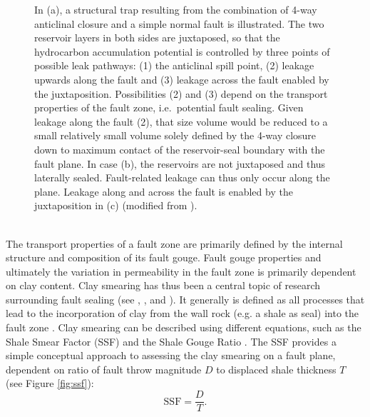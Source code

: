 \begin{figure}[h]
\begin{subfigure}{0.18\textwidth}
			\end{subfigure}
			\caption{In (a), a structural trap resulting from the combination of 4-way anticlinal closure and a simple normal fault is illustrated. The two reservoir layers in both sides are juxtaposed, so that the hydrocarbon accumulation potential is controlled by three points of possible leak pathways: (1) the anticlinal spill point, (2) leakage upwards along the fault and (3) leakage across the fault enabled by the juxtaposition. Possibilities (2) and (3) depend on the transport properties of the fault zone, i.e.\ potential fault sealing. Given leakage along the fault (2), that size volume would be reduced to a small relatively small volume solely defined by the 4-way closure down to maximum contact of the reservoir-seal boundary with the fault plane. In case (b), the reservoirs are not juxtaposed and thus laterally sealed. Fault-related leakage can thus only occur along the plane. Leakage along and across the fault is enabled by the juxtaposition in (c) (modified from \citet{van2003lateral}).}\label{fig:fault_trap_spills}
		\end{figure}\\
		The transport properties of a fault zone are primarily defined by the internal structure and composition of its fault gouge. Fault gouge properties and ultimately the variation in permeability in the fault zone is primarily dependent on clay content. Clay smearing has thus been a central topic of research surrounding fault sealing (see \citet{lindsay1993outcrop} \citet{yielding1997quantitative}, \citet{van2003lateral} , \citet{van2005processes} and \citet{schmatz2010clay}). It generally is defined as all processes that lead to the incorporation of clay from the wall rock (e.g. a shale as seal) into the fault zone \citep{van2003lateral, vrolijk2016clay}. Clay smearing can be described using different equations, such as the Shale Smear Factor (SSF) and the Shale Gouge Ratio \citep{lindsay1993outcrop, yielding1997quantitative, vrolijk2016clay}. The SSF provides a simple conceptual approach to assessing the clay smearing on a fault plane, dependent on ratio of fault throw magnitude $D$ to displaced shale thickness $T$ \citep{lindsay1993outcrop, yielding1997quantitative, yielding2012using} (see Figure \ref{fig:ssf}):
		\begin{equation}
			\text{SSF} = \frac{D}{T}.
		\end{equation}
